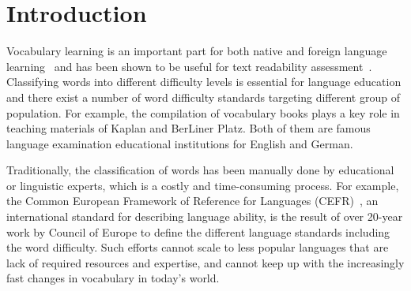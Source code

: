 \section{Introduction}
\label{sec:intro}

Vocabulary learning is an important part for both native and 
foreign language learning~\cite{grabe1991current,alqahtani2015importance} 
and has been shown to be useful for text readability assessment~\cite{nation2001learning,manyak2009english,qian2002investigating}. 
Classifying words into different difficulty levels is essential for language education and there exist a number of word difficulty standards targeting different group of population.
For example, the compilation of vocabulary books plays a key role in teaching materials of Kaplan and BerLiner Platz. Both of them are famous language examination educational institutions for English and German.

Traditionally, the classification of words has been manually done by
educational or linguistic experts, which is a costly and  time-consuming
process. For example, the Common European Framework of 
Reference for Languages  (CEFR)~\cite{little2006common,little2011common}, 
an international standard for describing language ability, is the result 
of over 20-year work by Council of Europe to define the different language standards including the word difficulty. 
Such efforts cannot scale to less popular languages that are lack of required resources and expertise, and cannot keep up with the increasingly fast changes in vocabulary in today's world.

